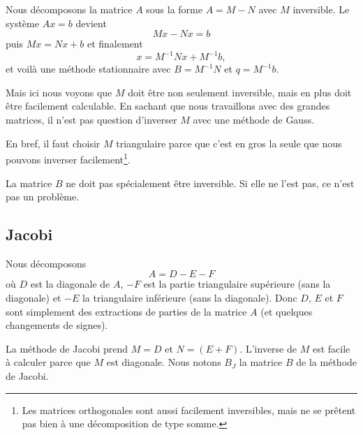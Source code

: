 Nous décomposons la matrice \( A\) sous la forme \( A=M-N\) avec \( M\) inversible. Le système \( Ax=b\) devient
\begin{equation}
	Mx-Nx=b
\end{equation}
puis \( Mx=Nx+b\) et finalement
\begin{equation}
	x=M^{-1}Nx+M^{-1}b,
\end{equation}
et voilà une méthode stationnaire avec \( B=M^{-1}N\) et \( q=M^{-1}b\).

Mais ici nous voyons que \( M\) doit être non seulement inversible, mais en plus doit être facilement calculable. En sachant que nous travaillons avec des grandes matrices, il n'est pas question d'inverser \( M\) avec une méthode de Gauss.

En bref, il faut choisir \( M\) triangulaire parce que c'est en gros la seule que nous pouvons inverser facilement\footnote{Les matrices orthogonales sont aussi facilement inversibles, mais ne se prêtent pas bien à une décomposition de type somme.}.

\begin{remark}
	La matrice \( B\) ne doit pas spécialement être inversible. Si elle ne l'est pas, ce n'est pas un problème.
\end{remark}

\subsection{Jacobi}

Nous décomposons
\begin{equation}        \label{EQooOCJYooCqsfQM}
	A=D-E-F
\end{equation}
où \( D\) est la diagonale de \( A\), \( -F\) est la partie triangulaire supérieure (sans la diagonale) et \( -E\) la triangulaire inférieure (sans la diagonale). Donc \( D\), \( E\) et \( F\) sont simplement des extractions de parties de la matrice \( A\) (et quelques changements de signes).

La méthode de Jacobi prend \( M=D\) et \( N=(E+F)\). L'inverse de \( M\) est facile à calculer parce que \( M\) est diagonale. Nous notons \( B_J\) la matrice \( B\) de la méthode de Jacobi.

